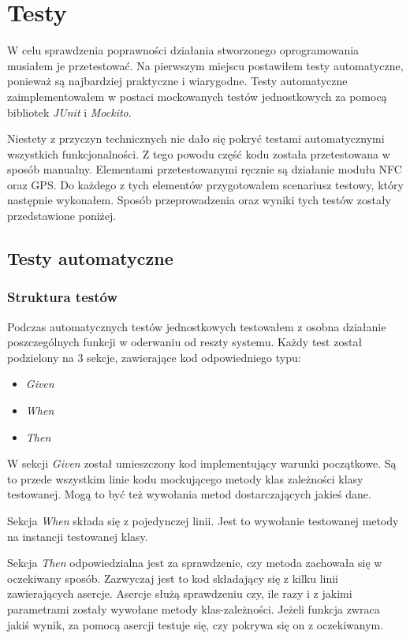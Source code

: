 \documentclass[openright]{xmgr}
\begin{document}
\chapter{Testy} 

W celu sprawdzenia poprawności działania stworzonego oprogramowania musiałem je przetestować. Na pierwszym miejscu postawiłem testy automatyczne, ponieważ są najbardziej praktyczne i wiarygodne. Testy automatyczne zaimplementowałem w postaci mockowanych testów jednostkowych za pomocą bibliotek \textit{JUnit} i \textit{Mockito}.

Niestety z przyczyn technicznych nie dało się pokryć testami automatycznymi wszystkich funkcjonalności. Z tego powodu część kodu została przetestowana w sposób manualny. Elementami przetestowanymi ręcznie są działanie modułu NFC oraz GPS. Do każdego z tych elementów przygotowałem scenariusz testowy, który następnie wykonałem. Sposób przeprowadzenia oraz wyniki tych testów zostały przedstawione poniżej.

\section{Testy automatyczne}
\subsection{Struktura testów}
Podczas  automatycznych testów jednostkowych testowałem z osobna działanie poszczególnych funkcji w oderwaniu od reszty systemu. Każdy test został podzielony na 3 sekcje, zawierające kod odpowiedniego typu:
\begin{itemize}
\item \textit{Given}
\item \textit{When}
\item \textit{Then}
\end{itemize}

W sekcji \textit{Given} został umieszczony kod implementujący warunki początkowe. Są to przede wszystkim linie kodu mockującego metody klas zależności klasy testowanej. Mogą to być też wywołania metod dostarczających jakieś dane. 

Sekcja \textit{When} składa się z pojedynczej linii. Jest to wywołanie testowanej metody na instancji testowanej klasy.

Sekcja \textit{Then} odpowiedzialna jest za sprawdzenie, czy metoda zachowała się w oczekiwany sposób. Zazwyczaj jest to kod składający się z kilku linii zawierających asercje. Asercje służą sprawdzeniu czy, ile razy i z jakimi parametrami zostały wywołane metody klas-zależności. Jeżeli funkcja zwraca jakiś wynik, za pomocą asercji testuje się, czy pokrywa się on z oczekiwanym.
\end{document}
